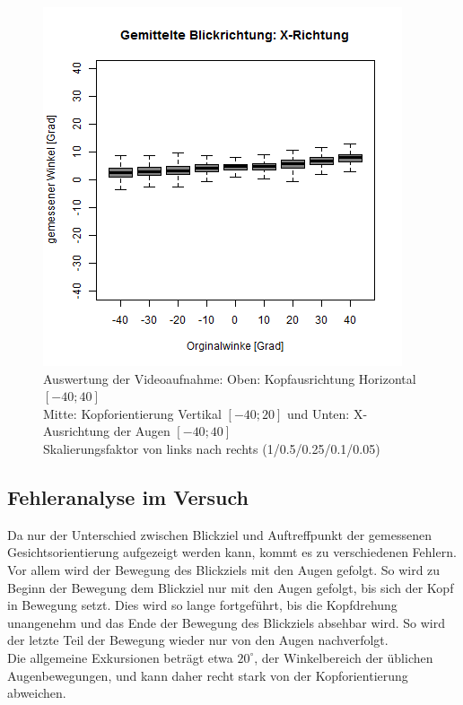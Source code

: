 \begin{figure}
	\includegraphics[width=0.192\linewidth]{OpenFace_Img/EyeAVG_x_S005}
	\caption{Auswertung der Videoaufnahme: Oben: Kopfausrichtung Horizontal $[-40;40]$\\
		Mitte: Kopforientierung Vertikal $[-40;20]$ und Unten: X-Ausrichtung der Augen $[-40;40]$\\
		Skalierungsfaktor von links nach rechts (1/0.5/0.25/0.1/0.05)}
	\label{graph_VideoSkalierung}
\end{figure}
\subsection{Fehleranalyse im Versuch}
Da nur der Unterschied zwischen Blickziel und Auftreffpunkt der gemessenen Gesichtsorientierung aufgezeigt werden kann, kommt es zu verschiedenen Fehlern. Vor allem wird der Bewegung des Blickziels mit den Augen gefolgt.
So wird zu Beginn der Bewegung dem Blickziel nur mit den Augen gefolgt, bis sich der Kopf in Bewegung setzt. Dies wird so lange fortgeführt, bis die Kopfdrehung unangenehm und das Ende der Bewegung des Blickziels absehbar wird. So wird der letzte Teil der Bewegung wieder nur von den Augen nachverfolgt.\\
Die allgemeine Exkursionen beträgt etwa $20^\circ$, der Winkelbereich der üblichen Augenbewegungen, und kann daher recht stark von der Kopforientierung abweichen.\cite{wiki_Gesichtsfeld}\\
